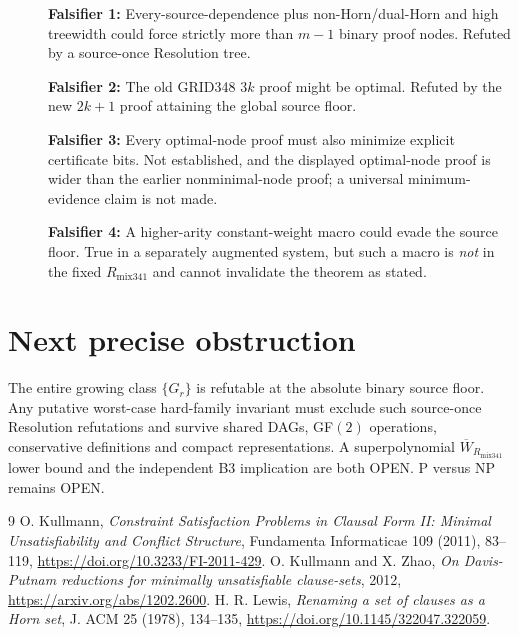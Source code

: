 \documentclass[11pt]{article}
\begin{document}
\begin{description}
\item[] \textbf{Falsifier 1:} Every-source-dependence plus non-Horn/dual-Horn and high treewidth could force strictly more than $m-1$ binary proof nodes. Refuted by a source-once Resolution tree.
\item[] \textbf{Falsifier 2:} The old GRID348 $3k$ proof might be optimal. Refuted by the new $2k+1$ proof attaining the global source floor.
\item[] \textbf{Falsifier 3:} Every optimal-node proof must also minimize explicit certificate bits. Not established, and the displayed optimal-node proof is wider than the earlier nonminimal-node proof; a universal minimum-evidence claim is not made.
\item[] \textbf{Falsifier 4:} A higher-arity constant-weight macro could evade the source floor. True in a separately augmented system, but such a macro is \emph{not} in the fixed $R_{\mathrm{mix341}}$ and cannot invalidate the theorem as stated.
\end{description}

\section*{Next precise obstruction}
The entire growing class $\{G_r\}$ is refutable at the absolute binary source floor. Any putative worst-case hard-family invariant must exclude such source-once Resolution refutations and survive shared DAGs, GF$(2)$ operations, conservative definitions and compact representations. A superpolynomial $\overline W_{R_{\mathrm{mix341}}}$ lower bound and the independent B3 implication are both OPEN. P versus NP remains OPEN.

\begin{thebibliography}{9}
 O. Kullmann, \emph{Constraint Satisfaction Problems in Clausal Form II: Minimal Unsatisfiability and Conflict Structure}, Fundamenta Informaticae 109 (2011), 83--119, \url{https://doi.org/10.3233/FI-2011-429}.
 O. Kullmann and X. Zhao, \emph{On Davis-Putnam reductions for minimally unsatisfiable clause-sets}, 2012, \url{https://arxiv.org/abs/1202.2600}.
 H. R. Lewis, \emph{Renaming a set of clauses as a Horn set}, J. ACM 25 (1978), 134--135, \url{https://doi.org/10.1145/322047.322059}.
\end{thebibliography}
\end{document}
